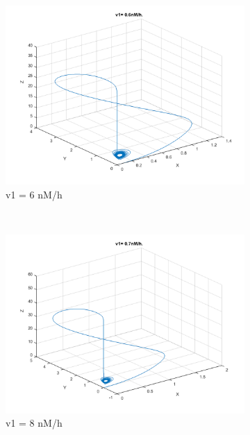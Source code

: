 \documentclass[10pt,a4paper,oneside,twocolumn]{article}
\numberwithin{equation}{section} %
\begin{document}
\begin{figure}
\begin{subfigure}[b]{0.32\textwidth}
	    \includegraphics[width=\textwidth]{LotsofthesameA/A-AA6.png}
	    \caption{v1 = 6 nM/h}
	\end{subfigure}
	~ 
	\begin{subfigure}[b]{0.32\textwidth}
	    \includegraphics[width=\textwidth]{LotsofthesameA/A-AA7.png}
	    \caption{v1 = 8 nM/h}
	\end{subfigure}
	~
	\begin{subfigure}[b]{0.32\textwidth}

\end{subfigure}
\end{figure}
\end{document}
